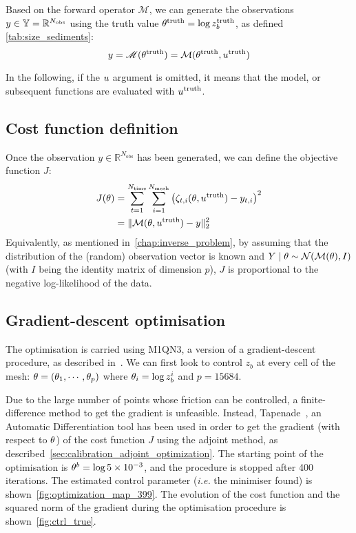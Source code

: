 \documentclass[../../Main_ManuscritThese.tex]{subfiles}
\newcommand{\zob}{z_b}
\begin{document}
Based on the forward operator $\mathscr{M}$, we can generate the
observations $y\in \mathbb{Y} = \mathbb{R}^{N_{\mathrm{obs}}}$ using the
truth value $\kk^{\mathrm{truth}}=\log \zob^{\mathrm{truth}}$, as
defined \cref{tab:size_sediments}:
\begin{equation}
  y = \mathscr{M}(\theta^{\mathrm{truth}}) = \mathcal{M}(\theta^{\mathrm{truth}}, u^{\mathrm{truth}})
\end{equation}

In the following, if the $u$ argument is omitted, it means that the
model, or subsequent functions are evaluated with
$u^{\mathrm{truth}}$.
\subsection{Cost function definition}
Once the observation $y \in \mathbb{R}^{N_{\mathrm{obs}}}$ has been generated, we can
define the objective function $J$:
\begin{align}
  \label{eq:cost_fun_definition}
  J(\theta) &= \sum_{t=1}^{ N_{\mathrm{time}}}\sum_{i=1}^{N_{\mathrm{mesh}}}  \left(\zeta_{t,i}(\theta,u^{\mathrm{truth}}) - y_{t, i}\right)^2 \\
         &= \|\mathcal{M}(\theta,u^{\mathrm{truth}}) - y\|_2^2
\end{align}
Equivalently, as mentioned in~\cref{chap:inverse_problem}, by assuming
that the distribution of the (random) observation vector is known and
$Y \mid \theta \sim \mathcal{N}(\mathcal{M}(\theta), I)$ (with $I$ being the
identity matrix of dimension $p$), $J$ is proportional to the negative
log-likelihood of the data.

\subsection{Gradient-descent optimisation}
\label{ssec:optim_gradient}
The optimisation is carried using M1QN3, a version of a
gradient-descent procedure, as described
in~\cite{gilbert_numerical_1989}. We can first look to control $\zob$
at every cell of the mesh: $\theta = (\theta_1,\cdots, \theta_p)$ where
$\kk_i = \log\zob^i$ and $p=\num{15684}$.

Due to the large number of points whose friction can be controlled, a
finite-difference method to get the gradient is unfeasible. Instead,
Tapenade~\citep{hascoet_tapenade_2013}, an Automatic Differentiation
tool has been used in order to get the gradient (with respect to
$\theta$) of the cost function $J$ using the adjoint method, as
described~\cref{sec:calibration_adjoint_optimization}. The starting
point of the optimisation is $\theta^b = \log \num{5e-3}$, and the
procedure is stopped after \num{400} iterations. The estimated control
parameter (\emph{i.e.} the minimiser found) is
shown~\cref{fig:optimization_map_399}.  The evolution of the cost
function and the squared norm of the gradient during the optimisation
procedure is shown~\cref{fig:ctrl_true}.
\end{document}
